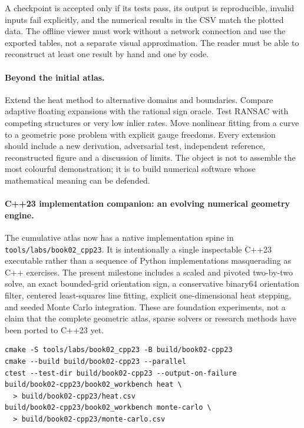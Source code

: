A checkpoint is accepted only if its tests pass, its output is
reproducible, invalid inputs fail explicitly, and the numerical
results in the CSV match the plotted data. The offline viewer must
work without a network connection and use the exported tables,
not a separate visual approximation. The reader must be able
to reconstruct at least one result by hand and one by code.

\paragraph{Beyond the initial atlas.}
Extend the heat method to alternative domains and boundaries.
Compare adaptive floating expansions with the rational sign oracle.
Test RANSAC with competing structures or very low inlier rates.
Move nonlinear fitting from a curve to a geometric pose problem with
explicit gauge freedoms. Every extension should include a new
derivation, adversarial test, independent reference, reconstructed
figure and a discussion of limits. The object is not to assemble
the most colourful demonstration; it is to build numerical software
whose mathematical meaning can be defended.


\begin{booktwoconcept}
\paragraph{C++23 implementation companion: an evolving numerical geometry engine.}
The cumulative atlas now has a native implementation spine in
\texttt{tools/labs/book02\_cpp23}. It is intentionally a single
inspectable C++23 executable rather than a sequence of Python
implementations masquerading as C++ exercises. The present milestone
includes a scaled and pivoted two-by-two solve, an exact bounded-grid
orientation sign, a conservative binary64 orientation filter,
centered least-squares line fitting, explicit one-dimensional heat
stepping, and seeded Monte Carlo integration. These are foundation
experiments, not a claim that the complete geometric atlas, sparse
solvers or research methods have been ported to C++23 yet.

\end{booktwoconcept}

\begin{Shaded}
\begin{verbatim}
cmake -S tools/labs/book02_cpp23 -B build/book02-cpp23
cmake --build build/book02-cpp23 --parallel
ctest --test-dir build/book02-cpp23 --output-on-failure
build/book02-cpp23/book02_workbench heat \
  > build/book02-cpp23/heat.csv
build/book02-cpp23/book02_workbench monte-carlo \
  > build/book02-cpp23/monte-carlo.csv
\end{verbatim}
\end{Shaded}

